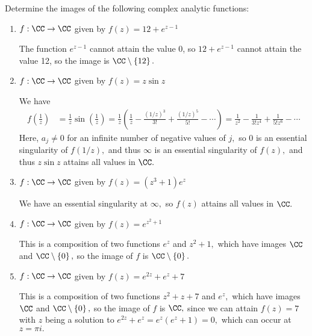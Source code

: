 \documentclass{article}
\begin{document}
Determine the images of the following complex analytic functions:
\begin{enumerate}
	\item $f:\CC\to\CC$ given by $f(z)=12+e^{z-1}$
		\begin{soln}
			The function $e^{z-1}$ cannot attain the value 0, so $12+e^{z-1}$ cannot attain the value 12, so the image is $\CC\setminus\left\{ 12 \right\}.$
		\end{soln}

	\item $f:\CC\to\CC$ given by $f(z)=z\sin z$
		\begin{soln}
			We have
			\begin{align*}
				f\left( \frac{1}{z} \right) &= \frac{1}{z}\sin \left( \frac{1}{z} \right) = \frac{1}{z} \left( \frac{1}{z} - \frac{(1/z)^3}{3!} + \frac{(1/z)^5}{5!} - \cdots \right) = \frac{1}{z^2} - \frac{1}{3!z^4} + \frac{1}{5!z^6} - \cdots
			\end{align*}
			Here, $a_j\neq 0$ for an infinite number of negative values of $j,$ so 0 is an essential singularity of $f(1/z),$ and thus $\infty$ is an essential singularity of $f(z),$ and thus $z\sin z$ attains all values in $\CC.$
		\end{soln}

	\item $f:\CC\to\CC$ given by $f(z)=(z^3+1)e^z$
		\begin{soln}
			We have an essential singularity at $\infty,$ so $f(z)$ attains all values in $\CC.$
		\end{soln}

	\item $f:\CC\to\CC$ given by $f(z)=e^{z^2+1}$
		\begin{soln}
			This is a composition of two functions $e^z$ and $z^2+1,$ which have images $\CC$ and $\CC\setminus\left\{ 0 \right\},$ so the image of $f$ is $\CC\setminus\left\{ 0 \right\}.$
		\end{soln}

	\item $f:\CC\to\CC$ given by $f(z)=e^{2z}+e^z+7$
		\begin{soln}
			This is a composition of two functions $z^2+z+7$ and $e^z,$ which have images $\CC$ and $\CC\setminus\left\{ 0 \right\},$ so the image of $f$ is $\CC,$ since we can attain $f(z)=7$ with $z$ being a solution to $e^{2z}+e^z=e^z\left( e^z+1 \right)=0,$ which can occur at $z=\pi i.$
		\end{soln}
		
\end{enumerate}
\end{document}

